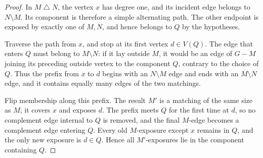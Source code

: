 \documentclass[10pt,a4paper]{amsart}
\newcommand{\symdiff}{\mathbin{\triangle}}    %
\begin{document}
\begin{proof}
  In $M\symdiff N$, the vertex $x$ has degree one, and its incident edge belongs
  to $N\setminus M$. Its component is therefore a simple alternating path. The
  other endpoint is exposed by exactly one of $M,N$, and hence belongs to $Q$ by
  the hypotheses.

  Traverse the path from $x$, and stop at its first vertex $d\in V(Q)$. The edge
  that enters $Q$ must belong to $M\setminus N$: if it lay outside $M$, it would
  be an edge of $G-M$ joining its preceding outside vertex to the component $Q$,
  contrary to the choice of $Q$. Thus the prefix from $x$ to $d$ begins with an
  $N\setminus M$ edge and ends with an $M\setminus N$ edge, and it contains
  equally many edges of the two matchings.

  Flip membership along this prefix. The result $M'$ is a matching of the same
  size as $M$; it covers $x$ and exposes $d$. The prefix meets $Q$ for the first
  time at $d$, so no complement edge internal to $Q$ is removed, and the final
  $M$-edge becomes a complement edge entering $Q$. Every old $M$-exposure except
  $x$ remains in $Q$, and the only new exposure is $d\in Q$. Hence all
  $M'$-exposures lie in the component containing $Q$.
\end{proof}
\end{document}
